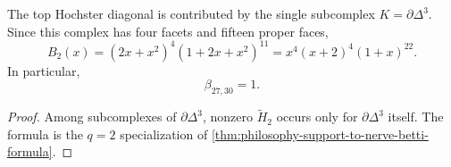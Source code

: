 \begin{corollary}
\label{cor:philosophy-top-diagonal-from-boundary-complex}
The top Hochster diagonal is contributed by the single subcomplex
$K=\partial\Delta^{3}$. Since this complex has four facets and fifteen
proper faces,
$$
  B_{2}(x)
  =
  (2x+x^{2})^{4}(1+2x+x^{2})^{11}
  =
  x^{4}(x+2)^{4}(1+x)^{22}.
$$
In particular,
$$
  \beta_{27,30}=1.
$$
\end{corollary}
\begin{proof}
Among subcomplexes of $\partial\Delta^{3}$, nonzero
$\widetilde{H}_{2}$ occurs only for $\partial\Delta^{3}$ itself. The
formula is the $q=2$ specialization of
\autoref{thm:philosophy-support-to-nerve-betti-formula}.
\end{proof}
